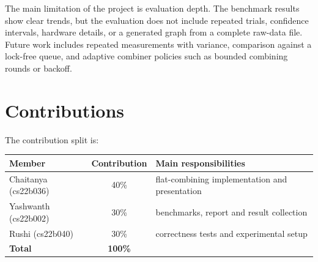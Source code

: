 \documentclass[11pt,a4paper]{article}
\begin{document}
The main limitation of the project is evaluation depth. The benchmark results show clear trends, but the evaluation does not include repeated trials, confidence intervals, hardware details, or a generated graph from a complete raw-data file. Future work includes repeated measurements with variance, comparison against a lock-free queue, and adaptive combiner policies such as bounded combining rounds or backoff.

\section{Contributions}
The contribution split is:

\begin{center}
\begin{tabular}{@{}lcl@{}}
\toprule
\textbf{Member} & \textbf{Contribution} & \textbf{Main responsibilities} \\
\midrule
Chaitanya (cs22b036)   & 40\% & flat-combining implementation and presentation \\
Yashwanth (cs22b002)   & 30\% & benchmarks, report and result collection \\
Rushi (cs22b040) & 30\% & correctness tests and experimental setup \\
\midrule
\textbf{Total} & \textbf{100\%} & \\
\bottomrule
\end{tabular}
\end{center}



\end{document}
